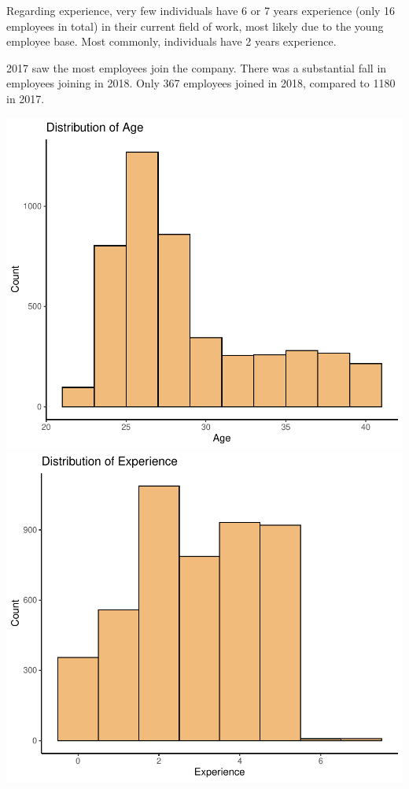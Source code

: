 \documentclass[11pt,preprint, authoryear]{elsarticle}
\numberwithin{equation}{section}
\numberwithin{figure}{section}
\numberwithin{table}{section}
\begin{document}
Regarding experience, very few individuals have 6 or 7 years experience
(only 16 employees in total) in their current field of work, most likely
due to the young employee base. Most commonly, individuals have 2 years
experience.

2017 saw the most employees join the company. There was a substantial
fall in employees joining in 2018. Only 367 employees joined in 2018,
compared to 1180 in 2017.

\includegraphics{Final_project_files/figure-latex/unnamed-chunk-3-1.pdf}
\includegraphics{Final_project_files/figure-latex/unnamed-chunk-3-2.pdf}
\end{document}

